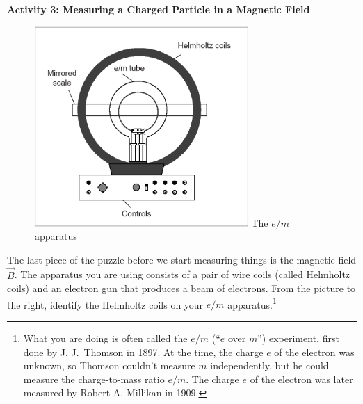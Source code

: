 \begin{enumerate}[labparts]

\end{enumerate}

\pagebreak[3]

\vspace*{0.2in}

\textbf{Activity 3: Measuring a Charged Particle in a Magnetic Field}


\begin{figure}
\begin{center}
\vspace{-0.5in}
\includegraphics[trim=2mm 2mm 2mm 2mm, clip, height=3.0in]{eoverm/apparatus1.pdf}
The $e/m$ apparatus
\end{center}
\end{figure}

\bigskip\bigskip

The last piece of the puzzle before we start measuring things is the magnetic 
field $\vec B$. The apparatus you are using consists of a pair of wire coils 
(called Helmholtz coils) and an electron gun that produces a beam of electrons.
From the picture to the right, identify the Helmholtz coils on your $e/m$ apparatus.\footnote{What you are doing is often called the $e/m$ (``$e$ over $m$'') experiment, first done by J. J.~Thomson in 1897.  At the time, the charge $e$ of the electron was unknown, so Thomson couldn't measure $m$ independently, but he could measure the charge-to-mass ratio $e/m$.   The charge $e$ of the electron was later measured by Robert A. Millikan in 1909.}



